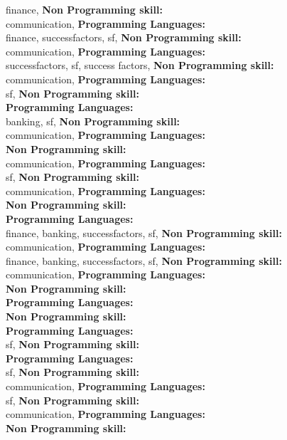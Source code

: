 finance, \textbf{Non Programming skill:} \\
communication, \textbf{Programming Languages:} \\
finance, successfactors, sf, \textbf{Non Programming skill:} \\
communication, \textbf{Programming Languages:} \\
successfactors, sf, success factors, \textbf{Non Programming skill:} \\
communication, \textbf{Programming Languages:} \\
sf, \textbf{Non Programming skill:} \\
\textbf{Programming Languages:} \\
banking, sf, \textbf{Non Programming skill:} \\
communication, \textbf{Programming Languages:} \\
\textbf{Non Programming skill:} \\
communication, \textbf{Programming Languages:} \\
sf, \textbf{Non Programming skill:} \\
communication, \textbf{Programming Languages:} \\
\textbf{Non Programming skill:} \\
\textbf{Programming Languages:} \\
finance, banking, successfactors, sf, \textbf{Non Programming skill:} \\
communication, \textbf{Programming Languages:} \\
finance, banking, successfactors, sf, \textbf{Non Programming skill:} \\
communication, \textbf{Programming Languages:} \\
\textbf{Non Programming skill:} \\
\textbf{Programming Languages:} \\
\textbf{Non Programming skill:} \\
\textbf{Programming Languages:} \\
sf, \textbf{Non Programming skill:} \\
\textbf{Programming Languages:} \\
sf, \textbf{Non Programming skill:} \\
communication, \textbf{Programming Languages:} \\
sf, \textbf{Non Programming skill:} \\
communication, \textbf{Programming Languages:} \\
\textbf{Non Programming skill:} \\
